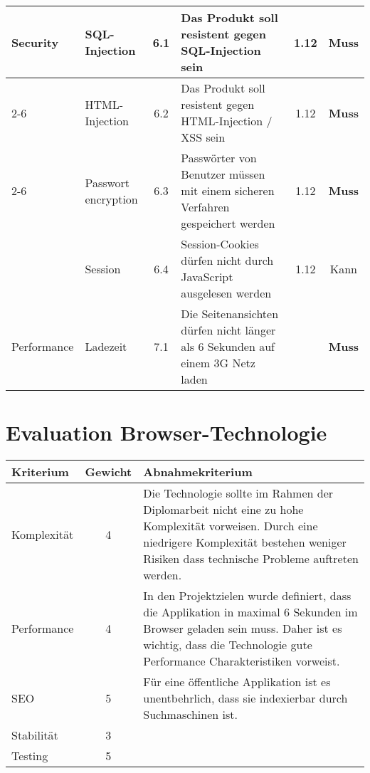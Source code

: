 \begin{longtable}[]{@{}p{1.9cm}p{2.5cm}cp{5.5cm}cc@{}}
  \midrule
  \multirow{9}{*}{Security}  & SQL-Injection              & 6.1          & Das Produkt soll resistent gegen SQL-Injection sein                                                         & 1.12          & \textbf{Muss}                \\ \cline{2-6}
                             & HTML-Injection             & 6.2          & Das Produkt soll resistent gegen HTML-Injection / XSS sein                                                  & 1.12          & \textbf{Muss}                \\ \cline{2-6}
                             & Passwort encryption        & 6.3          & Passwörter von Benutzer müssen mit einem sicheren Verfahren gespeichert werden                              & 1.12          & \textbf{Muss}                \\
                             & Session                    & 6.4          & Session-Cookies dürfen nicht durch JavaScript ausgelesen werden                                             & 1.12          & Kann                         \\
  \midrule
  Performance                & Ladezeit                   & 7.1          & Die Seitenansichten dürfen nicht länger als 6 Sekunden auf einem 3G Netz laden                              &               & \textbf{Muss}                \\
  \bottomrule
\end{longtable}


\clearpage
\section{Evaluation Browser-Technologie}\label{evaluation-browser-technologie}

\begin{longtable}[]{@{}p{2cm}cp{10cm}@{}}
  \toprule
  \textbf{Kriterium} & \textbf{Gewicht} & \textbf{Abnahmekriterium}\tabularnewline
  \midrule
  \endhead
  Komplexität        & 4                & Die Technologie sollte im Rahmen der Diplomarbeit nicht eine zu hohe Komplexität vorweisen. Durch eine niedrigere Komplexität bestehen weniger Risiken dass technische Probleme auftreten werden.\tabularnewline
  \midrule
  Performance        & 4                & In den Projektzielen wurde definiert, dass die Applikation in maximal 6 Sekunden im Browser geladen sein muss. Daher ist es wichtig, dass die Technologie gute Performance Charakteristiken vorweist.\tabularnewline
  \midrule
  SEO                & 5                & Für eine öffentliche Applikation ist es unentbehrlich, dass sie indexierbar durch Suchmaschinen ist.\tabularnewline
  \midrule
  Stabilität         & 3                & \tabularnewline
  \midrule
  Testing            & 5                & \tabularnewline
  \bottomrule
\end{longtable}

